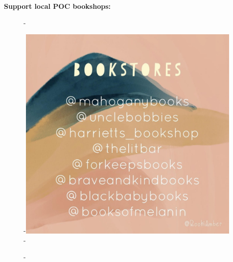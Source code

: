 \documentclass{article}\usepackage[]{graphicx}\usepackage[]{color}
\begin{document}
\large\textbf{Support local POC bookshops:} \\

{\begin{figure} [H]
  -\begin{center}
  -\includegraphics[width=11cm]{images/bookstores.jpg}
  -\end{center}
  -\end{figure}}
\end{document}
